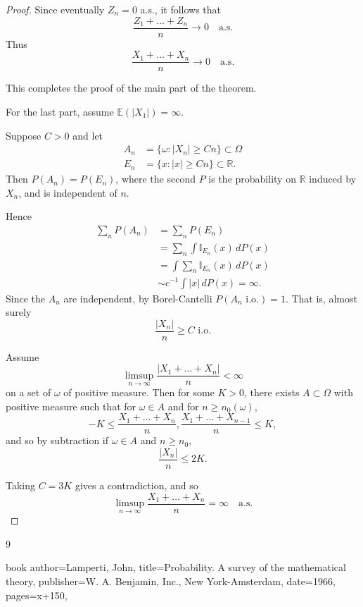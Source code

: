 \documentclass[a4paper]{amsart}
\theoremstyle{plain}
\theoremstyle{definition}
\theoremstyle{remark}
\begin{document}
\begin{proof}
Since eventually $ Z_n = 0 $ a.s., it follows that 
\[
\frac{Z_1+\dots+Z_n}{n}  \to 0 \quad \text{a.s.}
\]
Thus
\[
\frac{X_1+\dots+X_n}{n}  \to 0 \quad \text{a.s.}
\]

This completes the proof of the main part of the theorem.
 
\bigskip
For the last part, assume $ \mathbb{E} (|X_1|) = \infty $.

Suppose $ C > 0 $ and let
\begin{align*}
A_n &= \{ \omega : |X_n|\geq Cn \} \subset \Omega \\
E_n &= \{ x : |x| \geq Cn \} \subset \mathbb{R} .
\end{align*}
Then $ P(A_n) = P(E_n) $, where the second $ P $ is the probability on $ \mathbb{R} $ induced by $ X_n $, and is independent of $ n $.

Hence
\begin{align*}
\sum_n P(A_n) &= \sum_n P(E_n) \\
        &= \sum_n \int \mathbb{I}_{E_n}(x)\, dP(x) \\
        &=  \int  \sum_n\mathbb{I}_{E_n}(x)\, dP(x) \\
      &\sim c^{-1} \int |x|\, dP(x) = \infty.
      \end{align*} 
Since the $ A_n $ are independent, by Borel-Cantelli $ P(A_n \text{ i.o.}) = 1 $.  That is, almost surely 
\[
\frac{ |X_n|}{n}\geq C  \text{ i.o.}
\]

Assume 
\[
\limsup_{n\to \infty } \frac{|X_1+\dots +X_n|}{n}   < \infty
\]
on a set   of $ \omega $ of positive measure.  Then for some $ K > 0 $, there exists  $ A\subset \Omega $ with positive measure such that 
for $ \omega \in A $ and for $ n \geq n_0( \omega ) $,
\[ -K \leq \frac{X_1+\dots + X_n}{n}, \frac{X_1+\dots + X_{n-1}}{n} \leq K,
\]
and so by subtraction if $ \omega \in A $ and $ n \geq n_0 $, 
\[
\frac{|X_n|}{n} \leq 2K.
\]

Taking $ C = 3K $ gives a contradiction, and so 
\[
\limsup_{n\to \infty } \frac{X_1+\dots +X_n}{n} =\infty  \quad \text{a.s.}
\]
 \end{proof} 

 


\begin{thebibliography}{9} 


 
{book}{
   author={Lamperti, John},
   title={Probability. A survey of the mathematical theory},
   publisher={W. A. Benjamin, Inc., New York-Amsterdam},
   date={1966},
   pages={x+150},
}	

\end{thebibliography}
\end{document}
